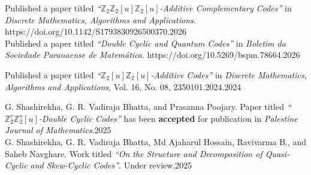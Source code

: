 \documentclass[
	a4paper,
	sidecolor=gray!50,
	sectioncolor=materialblue,
	subsectioncolor=materialindigo,
	profilepicsize=3.5cm,
	profilepicstyle=profilecircle,
	profilepiczoom=1.1,
]{sixtysecondscv}
\begin{document}
\vspace{2mm}
\begin{cvtable}

{Published a paper titled \textit{“\(\mathbb{Z}_2\mathbb{Z}_2[u]\mathbb{Z}_2[u]\)-Additive Complementary Codes”} in \textit{Discrete Mathematics, Algorithms and Applications}. https://doi.org/10.1142/S1793830926500370.}{2026}\\

{Published a paper titled \textit{“Double Cyclic and Quantum Codes”} in \textit{Boletim da Sociedade Paranaense de Matemática}. https://doi.org/10.5269/bspm.78664.}{2026}

{Published a paper titled \textit{“\(\mathbb{Z}_2[u]\mathbb{Z}_2[u]\)-Additive Codes”} in \textit{Discrete Mathematics, Algorithms and Applications}, Vol. 16, No. 08, 2350101.2024.}{2024}

{G. Shashirekha, G. R. Vadiraja Bhatta, and Prasanna Poojary. Paper titled \textit{“\(\mathbb{Z}_2^r \mathbb{Z}_2^s[u]\)-Double Cyclic Codes”} has been \textbf{accepted} for publication in \textit{Palestine Journal of Mathematics}.}{2025}\\

{G. Shashirekha, G. R. Vadiraja Bhatta, Md Ajaharul Hossain, Ravivarma B., and Saheb Navghare. Work titled \textit{“On the Structure and Decomposition of Quasi-Cyclic and Skew-Cyclic Codes”}. Under review.}{2025}

\end{cvtable}
\newpage
{}
\vspace{2mm}
\end{document}
